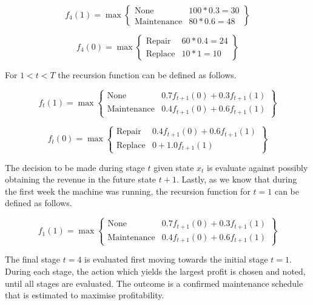 \documentclass[a4paper,11pt]{article}
\begin{document}
\begin{equation}
	f_4(1)= \max \begin{Bmatrix}
		\text{None} & 100*0.3 = 30 \\
		\text{Maintenance}& 80 *0.6 = 48 
	\end{Bmatrix}
\end{equation}

\begin{equation}
	f_4(0)= \max \begin{Bmatrix}
		\text{Repair}& 60*0.4 = 24 \\
		\text{Replace}& 10*1 =  10
	\end{Bmatrix}
\end{equation}

For $1<t<T$ the recursion function can be defined as follows.

\begin{equation}
	f_t(1)= \max \begin{Bmatrix}
		\text{None} & 0.7f_{t+1}(0)+0.3f_{t+1}(1)  \\
		\text{Maintenance}& 0.4f_{t+1}(0)+0.6f_{t+1}(1) 
	\end{Bmatrix}
\end{equation}

\begin{equation}
	f_t(0)= \max \begin{Bmatrix}
		\text{Repair}& 0.4f_{t+1}(0)+0.6f_{t+1}(1)  \\
		\text{Replace}& 0+1.0f_{t+1}(1) 
	\end{Bmatrix}
\end{equation}

The decision to be made during stage $t$ given state $x_t$ is evaluate against possibly obtaining the revenue in the future state $t+1$. Lastly, as we know that during the first week the machine was running, the recursion function for $t=1$ can be defined as follows.

\begin{equation}
	f_1(1)= \max \begin{Bmatrix}
		\text{None} & 0.7f_{t+1}(0)+0.3f_{t+1}(1)  \\
		\text{Maintenance}& 0.4f_{t+1}(0)+0.6f_{t+1}(1) 
	\end{Bmatrix}
\end{equation}

The final stage $t=4$ is evaluated first moving towards the initial stage $t=1$. During each stage, the action which yields the largest profit is chosen and noted, until all stages are evaluated. The outcome is a confirmed maintenance schedule that is estimated to maximise profitability.
\end{document}
